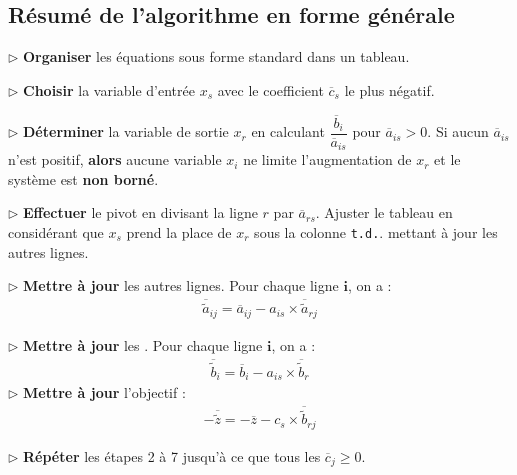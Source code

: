 \documentclass{report}
\begin{document}
\begin{multicols*}{2}
\section{Résumé de l'algorithme en forme générale}
\noindent
    $\rhd$ \textbf{Organiser} les équations sous forme standard dans un tableau.

    \noindent$\rhd$ \textbf{Choisir} la variable d'entrée $x_s$ avec le coefficient $\overline{c}_s$ le 
    plus négatif.

\noindent
    $\rhd$ \textbf{Déterminer} la variable de sortie $x_r$ en calculant 
    $\dfrac{\overline{b}_i}{\overline{a}_{is}}$ pour $\overline{a}_{is} > 0$.
    Si aucun \( \overline{a}_{is} \) n'est positif, \textbf{alors} 
    aucune variable $x_i$ ne limite l'augmentation de $x_r$ et le 
    système est \textbf{non borné}.  

\noindent
    $\rhd$ \textbf{Effectuer} le pivot en divisant la ligne $r$ par $\overline{a}_{rs}$. 
    Ajuster le tableau en considérant que $x_s$ prend la place de 
    $x_r$ sous la colonne \texttt{t.d.}. 
    mettant à jour les autres lignes.

\noindent
    $\rhd$ \textbf{Mettre à jour} les autres lignes. Pour chaque ligne $\boldsymbol{i}$, on a : 
    \begin{align*}
        \overline{\tilde{a}}_{ij} = \overline{a}_{ij} - a_{is} \times \overline{\tilde{a}}_{rj}
    \end{align*}

\noindent
    $\rhd$ \textbf{Mettre à jour} les   . Pour chaque ligne $\boldsymbol{i}$, on a : 
    \begin{align*}
        \overline{\tilde{b}}_{i} = \overline{b}_{i} - a_{is} \times \overline{\tilde{b}}_{r}
    \end{align*}
\noindent
    $\rhd$ \textbf{Mettre à jour} l'objectif :  
    \begin{align*}
        -\overline{\tilde{z}} = -\overline{z} - c_{s} \times \overline{\tilde{b}}_{rj}
    \end{align*}

\noindent
    $\rhd$ \textbf{Répéter} les étapes 2 à 7 jusqu'à ce que tous les $\overline{c}_j \geq 0$.
\end{multicols*}
\end{document}
